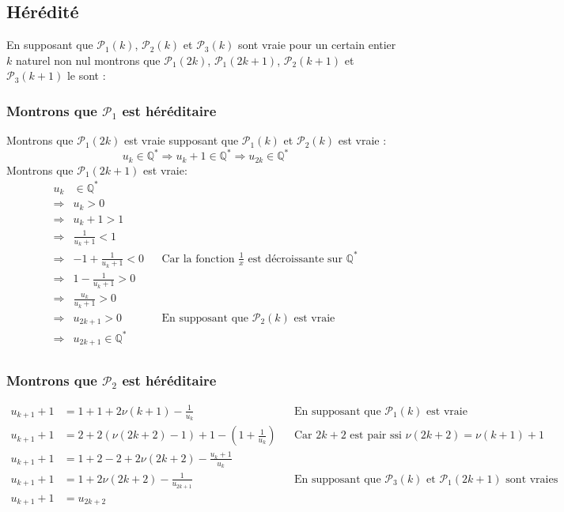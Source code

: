 \documentclass{exam}
\newcommand*{\p}{\mathcal{P}}
\newcommand*{\QS}{\mathbb{Q}^*}
\begin{document}
\subsection{Hérédité}
En supposant que $\p_1(k)$, $\p_2(k)$ et $\p_3(k)$
sont vraie pour un certain entier $k$ naturel non nul
montrons que $\p_1(2k)$, $\p_1(2k+1)$, $\p_2(k+1)$ et $\p_3(k+1)$ le sont :

\subsubsection{Montrons que $\p_1$ est héréditaire}
Montrons que $\p_1(2k)$ est vraie supposant que $\p_1(k)$ et $\p_2(k)$ est vraie :
$$
u_k \in \QS \Rightarrow u_k+1 \in \QS \Rightarrow u_{2k}  \in \QS
$$
Montrons que $\p_1(2k+1)$ est vraie:
\begin{align*}
u_k& \in \QS
\\
\Rightarrow &u_k>0
\\
\Rightarrow &u_k+1>1
\\
\Rightarrow &\frac{1}{u_k+1}<1
\\
\Rightarrow &-1+\frac{1}{u_k+1}<0
&&
\text{Car la fonction $\frac{1}{x}$ est décroissante sur $\QS$}
\\
\Rightarrow &1-\frac{1}{u_k+1}>0
\\
\Rightarrow & \frac{u_k}{u_k+1}>0
\\
\Rightarrow & u_{2k+1}>0
&&
\text{En supposant que $\p_2(k)$ est vraie}
\\
\Rightarrow & u_{2k+1}  \in \QS
\\
\end{align*}
\subsubsection{Montrons que $\p_2$ est héréditaire}
\begin{align*}
u_{k+1}+1&=1+1+2\nu(k+1)-\frac{1}{u_k}
&&\text{En supposant que $\p_1(k)$ est vraie}
\\
u_{k+1}+1&=2+2(\nu(2k+2)-1)+1-\left(1+\frac{1}{u_k}\right)
&&\text{Car $2k+2$ est pair ssi $\nu(2k+2)=\nu(k+1)+1$}
\\
u_{k+1}+1&=1+2-2+2\nu(2k+2)-\frac{u_k+1}{u_k}\\
u_{k+1}+1&=1+2\nu(2k+2)-\frac{1}{u_{2k+1}}
&&\text{En supposant que $\p_3(k)$ et $\p_1(2k+1)$ sont vraies}
\\
u_{k+1}+1&=u_{2k+2}
\\
\end{align*}
\end{document}
